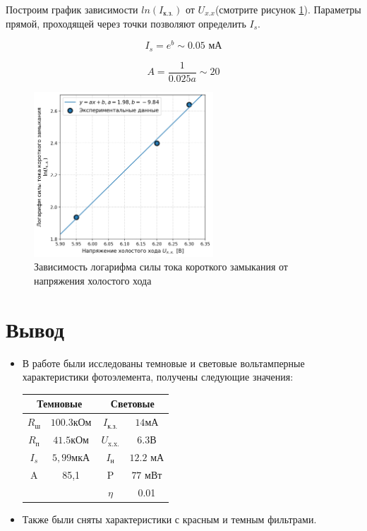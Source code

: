 \documentclass[a4paper, 12pt]{extarticle}
\begin{document}
Построим график зависимости $ln(I_{\text{к.з.}})$ от $U_{x.x}$(смотрите рисунок \ref{fig:line}). Параметры прямой, проходящей через точки позволяют определить $I_s$.

\begin{equation}
    I_{s} = e^{b} \sim 0.05 \text{ мА}
\end{equation}

\begin{equation}
    A = \frac{1}{0.025 a} \sim 20
\end{equation}


\begin{figure}[htbp]
    \centering
    \includegraphics[width = 0.6\textwidth]{pics/line.png}
    \caption{Зависимость логарифма силы тока короткого замыкания от напряжения холостого хода}
    \label{fig:line}
\end{figure}

\newpage
\section*{\textcolor{header}{Вывод}}

\begin{itemize}
    \item В работе были исследованы темновые и световые вольтамперные характеристики фотоэлемента, получены следующие значения:
   
   \begin{table}[hbtp]
   \centering 
   \begin{tabular}{cc|cc}
   \multicolumn{2}{c|}{Темновые} & \multicolumn{2}{c}{Световые} \\ \hline
   $R_\text{ш}$ & $100.3 \text{кОм}$ & $I_{\text{к.з.}}$ & $14 \text{мА}$ \\
   $R_\text{п}$ & $41.5 \text{кОм}$ & $U_{\text{x.x.}}$ & $6.3 \text{В}$ \\
   $I_s$ & $5,99 \text{мкА}$ & $I_{\text{н}}$ & $12.2 \text{ мА}$ \\
   A & 85,1 & P & $77 \text{ мВт}$ \\
    & & $\eta$ & 0.01 
   \end{tabular}
   \end{table}
   
    \item Также были сняты характеристики с красным и темным фильтрами.
   
   \end{itemize}
\end{document}
